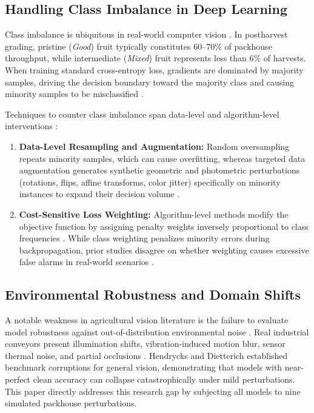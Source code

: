 \documentclass[conference]{IEEEtran}
\begin{document}
\subsection{Handling Class Imbalance in Deep Learning}
Class imbalance is ubiquitous in real-world computer vision \cite{he2009learning, buda2018systematic}. In postharvest grading, pristine (\textit{Good}) fruit typically constitutes 60--70\% of packhouse throughput, while intermediate (\textit{Mixed}) fruit represents less than 6\% of harvests. When training standard cross-entropy loss, gradients are dominated by majority samples, driving the decision boundary toward the majority class and causing minority samples to be misclassified \cite{lin2017focal, cui2019class}.

Techniques to counter class imbalance span data-level and algorithm-level interventions \cite{buda2018systematic}:
\begin{enumerate}
    \item \textbf{Data-Level Resampling and Augmentation:} Random oversampling repeats minority samples, which can cause overfitting, whereas targeted data augmentation generates synthetic geometric and photometric perturbations (rotations, flips, affine transforms, color jitter) specifically on minority instances to expand their decision volume \cite{shorten2019survey}.
    \item \textbf{Cost-Sensitive Loss Weighting:} Algorithm-level methods modify the objective function by assigning penalty weights inversely proportional to class frequencies \cite{he2009learning}. While class weighting penalizes minority errors during backpropagation, prior studies disagree on whether weighting causes excessive false alarms in real-world scenarios \cite{buda2018systematic, cui2019class}.
\end{enumerate}

\subsection{Environmental Robustness and Domain Shifts}
A notable weakness in agricultural vision literature is the failure to evaluate model robustness against out-of-distribution environmental noise \cite{hendrycks2019benchmarking}. Real industrial conveyors present illumination shifts, vibration-induced motion blur, sensor thermal noise, and partial occlusions \cite{cubero2011review}. Hendrycks and Dietterich \cite{hendrycks2019benchmarking} established benchmark corruptions for general vision, demonstrating that models with near-perfect clean accuracy can collapse catastrophically under mild perturbations. This paper directly addresses this research gap by subjecting all models to nine simulated packhouse perturbations.
\end{document}

